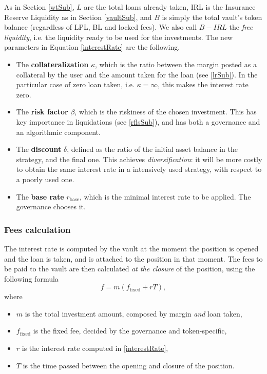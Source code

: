 \documentclass[a4paper,10 pt]{article}
\theoremstyle{definition}
\begin{document}
As in Section \ref{wtSub}, $L$ are the total loans already taken, IRL is the Insurance Reserve Liquidity as in Section \ref{vaultSub}, and $B$ is simply the total vault's token balance (regardless of LPL, BL and locked fees). We also call $B-IRL$ the {\it free liquidity}, i.e. the liquidity ready to be used for the investments. The new parameters in Equation \eqref{interestRate} are the following.
\begin{itemize}
\item The {\bf collateralization} $\kappa$, which is the ratio between the margin posted as a collateral by the user and the amount taken for the loan (see \ref{lrSub}). In the particular case of zero loan taken, i.e. $\kappa = \infty$, this makes the interest rate zero.
\item The {\bf risk factor} $\beta$, which is the riskiness of the chosen investment. This has key importance in liquidations (see \ref{rflsSub}), and has both a governance and an algorithmic component.
\item The {\bf discount} $\delta$, defined as the ratio of the initial asset balance in the strategy, and the final one. This achieves {\it diversification}: it will be more costly to obtain the same interest rate in a intensively used strategy, with respect to a poorly used one. 
\item The {\bf base rate} $r_\text{base}$, which is the minimal interest rate to be applied. The governance chooses it.
\end{itemize}

\subsubsection{Fees calculation}\label{dfSubSub}

The interest rate is computed by the vault at the moment the position is opened and the loan is taken, and is attached to the position in that moment. The fees to be paid to the vault are then calculated {\it at the closure} of the position, using the following formula 
\begin{equation}\label{duefees}
f = m(f_{\text{fixed}} + rT),
\end{equation}
where
\begin{itemize}
\item $m$ is the total investment amount, composed by margin {\it and} loan taken,
\item $f_{\text{fixed}}$ is the fixed fee, decided by the governance and token-specific,
\item  $r$ is the interest rate computed in \eqref{interestRate},
\item $T$ is the time passed between the opening and closure of the position.
\end{itemize}
\end{document}
